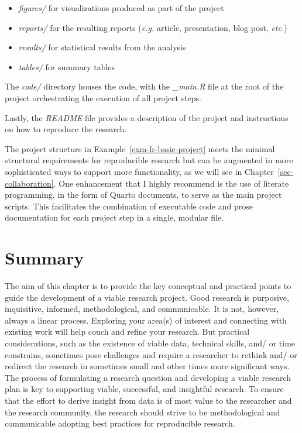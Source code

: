 \documentclass[
  letterpaper,
  DIV=11,
  numbers=noendperiod]{scrreport}
\providecommand{\tightlist}{%
  \setlength{\itemsep}{0pt}\setlength{\parskip}{0pt}}\usepackage{longtable,booktabs,array}
\theoremstyle{definition}
\theoremstyle{remark}
\begin{document}
\begin{itemize}
\tightlist
\item
  \emph{figures/} for visualizations produced as part of the project
\item
  \emph{reports/} for the resulting reports (\emph{e.g.} article,
  presentation, blog post, \emph{etc.})
\item
  \emph{results/} for statistical results from the analysis
\item
  \emph{tables/} for summary tables
\end{itemize}

The \emph{code/} directory houses the code, with the \emph{\_main.R}
file at the root of the project orchestrating the execution of all
project steps.

Lastly, the \emph{README} file provides a description of the project and
instructions on how to reproduce the research.

The project structure in Example~\ref{exm-fr-basic-project} meets the
minimal structural requirements for reproducible research but can be
augmented in more sophisticated ways to support more functionality, as
we will see in Chapter~\ref{sec-collaboration}. One enhancement that I
highly recommend is the use of literate programming, in the form of
Quarto documents, to serve as the main project scripts. This facilitates
the combination of executable code and prose documentation for each
project step in a single, modular file.

\hypertarget{summary-3}{%
\section*{Summary}\label{summary-3}}


The aim of this chapter is to provide the key conceptual and practical
points to guide the development of a viable research project. Good
research is purposive, inquisitive, informed, methodological, and
communicable. It is not, however, always a linear process. Exploring
your area(s) of interest and connecting with existing work will help
couch and refine your research. But practical considerations, such as
the existence of viable data, technical skills, and/ or time constrains,
sometimes pose challenges and require a researcher to rethink and/ or
redirect the research in sometimes small and other times more
significant ways. The process of formulating a research question and
developing a viable research plan is key to supporting viable,
successful, and insightful research. To ensure that the effort to derive
insight from data is of most value to the researcher and the research
community, the research should strive to be methodological and
communicable adopting best practices for reproducible research.
\end{document}
